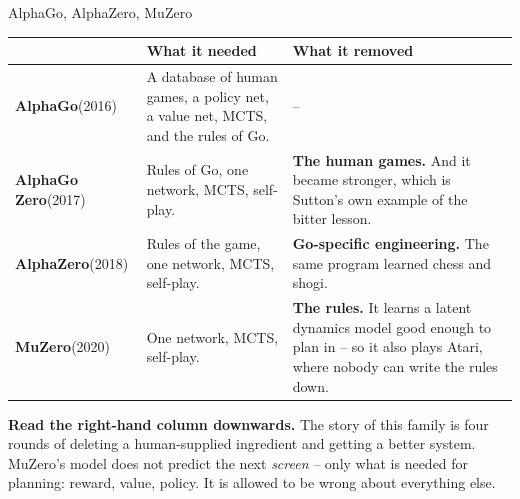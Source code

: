 \documentclass[aspectratio=169]{beamer}
\begin{document}
\begin{frame}{AlphaGo, AlphaZero, MuZero}
  \footnotesize
  \begin{center}
  \begin{tabular}{p{1.9cm} p{4.6cm} p{6.0cm}}
    \toprule
    & \textbf{What it needed} & \textbf{What it removed} \\
    \midrule
    \textbf{AlphaGo}\newline (2016) &
      A database of human games, a policy net, a value net, MCTS, and the rules of Go. &
      -- \\[5pt]
    \textbf{AlphaGo Zero}\newline (2017) &
      Rules of Go, one network, MCTS, self-play. &
      \textbf{The human games.} And it became stronger, which is Sutton's own example of the
      bitter lesson. \\[5pt]
    \textbf{AlphaZero}\newline (2018) &
      Rules of the game, one network, MCTS, self-play. &
      \textbf{Go-specific engineering.} The same program learned chess and shogi. \\[5pt]
    \textbf{MuZero}\newline (2020) &
      One network, MCTS, self-play. &
      \textbf{The rules.} It learns a latent dynamics model good enough to plan in -- so it also
      plays Atari, where nobody can write the rules down. \\
    \bottomrule
  \end{tabular}
  \end{center}

  \vskip 6pt
  \begin{tcolorbox}[colback=armblue!8, colframe=armblue, boxrule=0.6pt, arc=2pt]
    \footnotesize
    \textbf{Read the right-hand column downwards.} The story of this family is four rounds of
    deleting a human-supplied ingredient and getting a better system. MuZero's model does not
    predict the next \emph{screen} -- only what is needed for planning: reward, value, policy.
    It is allowed to be wrong about everything else.
  \end{tcolorbox}
\end{frame}
\end{document}
